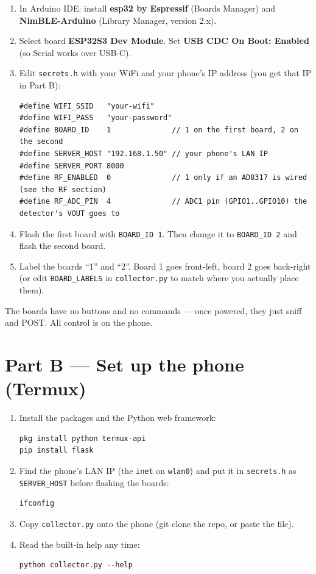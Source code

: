 \documentclass[11pt]{article}
\begin{document}
\begin{enumerate}
  \item In Arduino IDE: install \textbf{esp32 by Espressif} (Boards Manager) and
        \textbf{NimBLE-Arduino} (Library Manager, version 2.x).
  \item Select board \textbf{ESP32S3 Dev Module}. Set \textbf{USB CDC On Boot:
        Enabled} (so Serial works over USB-C).
  \item Edit \texttt{secrets.h} with your WiFi and your phone's IP address (you
        get that IP in Part B):
\begin{lstlisting}
#define WIFI_SSID   "your-wifi"
#define WIFI_PASS   "your-password"
#define BOARD_ID    1              // 1 on the first board, 2 on the second
#define SERVER_HOST "192.168.1.50" // your phone's LAN IP
#define SERVER_PORT 8000
#define RF_ENABLED  0              // 1 only if an AD8317 is wired (see the RF section)
#define RF_ADC_PIN  4              // ADC1 pin (GPIO1..GPIO10) the detector's VOUT goes to
\end{lstlisting}
  \item Flash the first board with \texttt{BOARD\_ID 1}. Then change it to
        \texttt{BOARD\_ID 2} and flash the second board.
  \item Label the boards ``1'' and ``2''. Board 1 goes front-left, board 2 goes
        back-right (or edit \texttt{BOARD\_LABELS} in \texttt{collector.py} to
        match where you actually place them).
\end{enumerate}

The boards have no buttons and no commands --- once powered, they just sniff and
POST. All control is on the phone.

\section{Part B --- Set up the phone (Termux)}

\begin{enumerate}
  \item Install the packages and the Python web framework:
\begin{lstlisting}
pkg install python termux-api
pip install flask
\end{lstlisting}
  \item Find the phone's LAN IP (the \texttt{inet} on \texttt{wlan0}) and put it
        in \texttt{secrets.h} as \texttt{SERVER\_HOST} before flashing the boards:
\begin{lstlisting}
ifconfig
\end{lstlisting}
  \item Copy \texttt{collector.py} onto the phone (git clone the repo, or paste
        the file).
  \item Read the built-in help any time:
\begin{lstlisting}
python collector.py --help
\end{lstlisting}
\end{enumerate}
\end{document}
